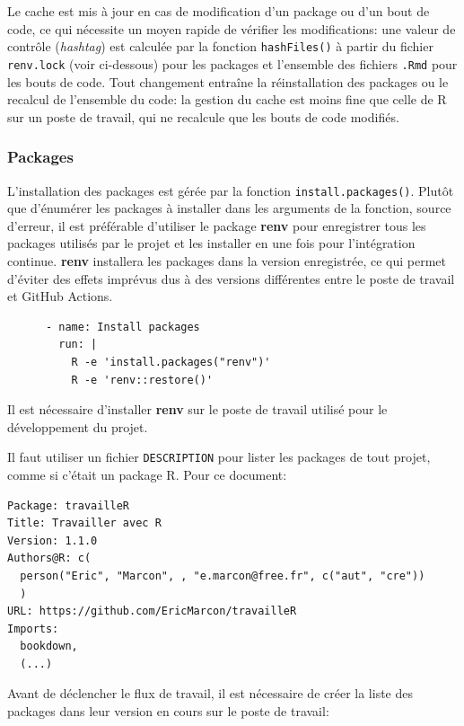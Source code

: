 \documentclass[
  11pt,
  french,
  a4paper,
  extrafontsizes,onecolumn,openright
  ]{memoir}
\begin{document}
Le cache est mis à jour en cas de modification d'un package ou d'un bout de code, ce qui nécessite un moyen rapide de vérifier les modifications: une valeur de contrôle (\emph{hashtag}) est calculée par la fonction \texttt{hashFiles()} à partir du fichier \texttt{renv.lock} (voir ci-dessous) pour les packages et l'ensemble des fichiers \texttt{.Rmd} pour les bouts de code.
Tout changement entraîne la réinstallation des packages ou le recalcul de l'ensemble du code: la gestion du cache est moins fine que celle de R sur un poste de travail, qui ne recalcule que les bouts de code modifiés.

\hypertarget{sec:packages-ci}{%
\subsubsection{Packages}\label{sec:packages-ci}}

L'installation des packages est gérée par la fonction \texttt{install.packages()}.
Plutôt que d'énumérer les packages à installer dans les arguments de la fonction, source d'erreur, il est préférable d'utiliser le package \textbf{renv} pour enregistrer tous les packages utilisés par le projet et les installer en une fois pour l'intégration continue.
\textbf{renv} installera les packages dans la version enregistrée, ce qui permet d'éviter des effets imprévus dus à des versions différentes entre le poste de travail et GitHub Actions.

\begin{verbatim}
      - name: Install packages
        run: |
          R -e 'install.packages("renv")'
          R -e 'renv::restore()'
\end{verbatim}

Il est nécessaire d'installer \textbf{renv} sur le poste de travail utilisé pour le développement du projet.

Il faut utiliser un fichier \texttt{DESCRIPTION} pour lister les packages de tout projet, comme si c'était un package R.
Pour ce document:

\begin{verbatim}
Package: travailleR
Title: Travailler avec R
Version: 1.1.0
Authors@R: c(
  person("Eric", "Marcon", , "e.marcon@free.fr", c("aut", "cre"))
  )
URL: https://github.com/EricMarcon/travailleR
Imports:
  bookdown,
  (...)
\end{verbatim}

Avant de déclencher le flux de travail, il est nécessaire de créer la liste des packages dans leur version en cours sur le poste de travail:
\end{document}
